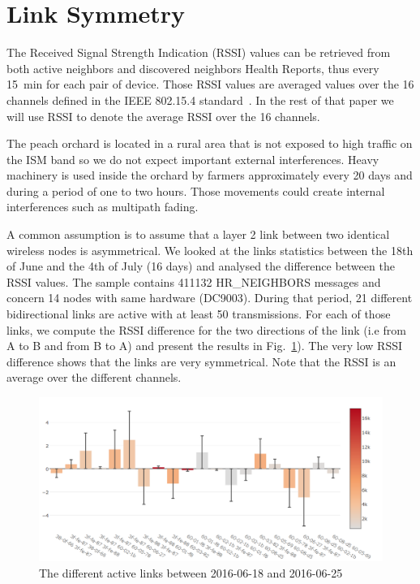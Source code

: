 \documentclass{sig-alternate}
\begin{document}
\section{Link Symmetry}
\label{sec:symmetry}



The Received Signal Strength Indication (RSSI) values can be retrieved from both active neighbors and discovered neighbors Health Reports, thus every 15~min for each pair of device.
Those RSSI values are averaged values over the 16 channels defined in the IEEE 802.15.4 standard~\cite{std_ieee802154_2011}.
In the rest of that paper we will use RSSI to denote the average RSSI over the 16 channels.


The peach orchard is located in a rural area that is not exposed to high traffic on the ISM band so we do not expect important external interferences.
Heavy machinery is used inside the orchard by farmers approximately every 20 days and during a period of one to two hours.
Those movements could create internal interferences such as multipath fading.


A common assumption is to assume that a layer 2 link between two identical wireless nodes is asymmetrical.
We looked at the links statistics between the 18th of June and the 4th of July (16 days) and analysed the difference between the RSSI values.
The sample contains 411132 HR\_NEIGHBORS messages and concern 14 nodes with same hardware (DC9003).
During that period, 21 different bidirectional links are active with at least 50 transmissions.
For each of those links, we compute the RSSI difference for the two directions of the link (i.e from A to B and from B to A) and present the results in Fig.~\ref{fig:tab_symmetry}).
The very low RSSI difference shows that the links are very symmetrical.
Note that the RSSI is an average over the different channels.

\begin{figure}
    \centering
    \includegraphics[width=\columnwidth]{sym_plot}
    \caption{The different active links between 2016-06-18 and 2016-06-25}
    \label{fig:tab_symmetry}
\end{figure}
\end{document}
